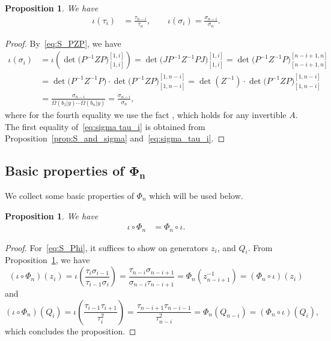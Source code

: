 \documentclass[pdftex]{sigma}
\numberwithin{equation}{section}
\newtheorem{Proposition}[Theorem]{Proposition}
\theoremstyle{definition}
\begin{document}
\begin{Proposition}
\label{prop:S_on_tau}
We have
\begin{align}
\label{eq:sigma tau_i}
\iota(\tau_i)&=\frac{\tau_{n-i}}{\tau_n},\qquad
\iota(\sigma_i)=\frac{\sigma_{n-i}}{\sigma_n}.
\end{align}
\end{Proposition}
\begin{proof}
By~\eqref{eq:S_PZP}, we have
\begin{align*}
\iota(\sigma_i)
&=\iota\left(\det\bigl(P^{-1}ZP\bigr)_{[1,i]}^{[1,i]}\right)=\det\bigl(JP^{-1}Z^{-1}PJ\bigr)_{[1,i]}^{[1,i]}=\det\bigl(P^{-1}Z^{-1}P\bigr)_{[n-i+1,n]}^{[n-i+1,n]}\\
&=
\det\bigl(P^{-1}Z^{-1}P\bigr)\cdot\det\bigl(P^{-1}ZP\bigr)_{[1,n-i]}^{[1,n-i]}=
\det(Z^{-1})\cdot\det\bigl(P^{-1}ZP\bigr)_{[1,n-i]}^{[1,n-i]}\\
&=\frac{\sigma_{n-i}}{\Omega(b_1|y)\cdots \Omega(b_n|y)}
=\frac{\sigma_{n-i}}{\sigma_n},
\end{align*}
where for the fourth equality
we use
the fact
,
which holds for any invertible $A$.
The first equality of~\eqref{eq:sigma tau_i} is obtained from Proposition~\ref{prop:S_and_sigma} and~\eqref{eq:sigma_tau_i}.
\end{proof}


\subsection[Basic properties of Phi\_n]{Basic properties of $\boldsymbol{\Phi_n}$}
We collect some basic properties of $\Phi_n$ which will be used below.

\begin{Proposition}\label{prop:S_commutes}
We have
\begin{align}
 \iota\circ \Phi_n&=\Phi_n \circ \iota.\label{eq:S_Phi}
\end{align}
\end{Proposition}
\begin{proof}
 For~\eqref{eq:S_Phi}, it suffices to show on generators $z_i$, and $Q_i$.
From Proposition~\ref{prop:S_on_tau}, we have
\[
(\iota\circ \Phi_n)(z_i)
=\iota\left(\frac{\tau_i\sigma_{i-1}}{\tau_{i-1}\sigma_i}\right)
=\frac{\tau_{n-i}\sigma_{n-i+1}}{\sigma_{n-i}\tau_{n-i+1}}=\Phi_n(z_{n-i+1}^{-1})
=(\Phi_n\circ \iota)(z_i)\]
and
\[
(\iota\circ\Phi_n)(Q_i)=\iota\left(\frac{\tau_{i-1}\tau_{i+1}}{\tau^2_{i}}\right)=
\frac{\tau_{n-i+1}\tau_{n-i-1}}{\tau^2_{n-i}}=\Phi_n(Q_{n-i})
=(\Phi_n\circ \iota)(Q_i),
\]
which concludes the proposition.
\end{proof}
\end{document}
